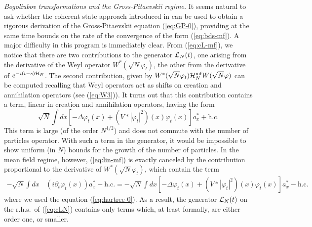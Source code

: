 \documentclass[11pt,a4paper]{article}
\newcommand{\cH}{{\cal H}}
\newcommand{\cL}{{\cal L}}
\begin{document}
{\it Bogoliubov transformations and the Gross-Pitaevskii regime.} It seems natural to ask whether the coherent state approach introduced in \cite{RS} can be used to obtain a rigorous derivation of the Gross-Pitaevskii equation (\ref{eq:GP-0}), providing at the same time bounds on the rate of the convergence of the form (\ref{eq:bds-mf}). A major difficulty in this program is immediately clear. 
{F}rom (\ref{eq:cL-mf}), we notice that there are two contributions to the generator $\cL_N (t)$, one 
 arising from the derivative of the Weyl operator $W^* (\sqrt{N} \varphi_t)$, the other from the derivative of $e^{-i (t-s) \cH_N}$. The second contribution, given by $W^* (\sqrt{N} \varphi_t) \cH^{\text{mf}}_N W(\sqrt{N} \varphi)$ can be computed recalling that Weyl operators act as shifts on creation and annihilation operators (see (\ref{eq:W3})). It turns out that this contribution contains a term, linear in creation and annihilation operators, having the form
\begin{equation}\label{eq:lin-mf}  \sqrt{N} \int dx \left[ -\Delta \varphi_t (x) + (V*|\varphi_t|^2) (x) \varphi_t (x) \right] a_x^* + \text{h.c.} \end{equation}
This term is large (of the order $N^{1/2}$) and does not commute with the number of particles operator. With such a term in the generator, it would be impossible to show uniform (in $N$) bounds for the growth of the number of particles. In the mean field regime, however, (\ref{eq:lin-mf}) is exactly 
canceled by the contribution proportional to the derivative of $W^* (\sqrt{N} \varphi_t)$, which contain the term
\[ \begin{split} -\sqrt{N} \int dx \, & ( i \partial_t \varphi_t (x) ) a_x^* - \text{h.c.} = -
\sqrt{N} \int dx \left[ -\Delta \varphi_t (x) + (V*|\varphi_t|^2) (x) \varphi_t (x) \right] a_x^* - \text{h.c.} 
\end{split}
\]
where we used the equation (\ref{eq:hartree-0}). As a result, the generator $\cL_N (t)$ on the r.h.s.\ of (\ref{eq:cLN}) contains only terms which, at least formally, are either order one, or smaller. 
\end{document}

